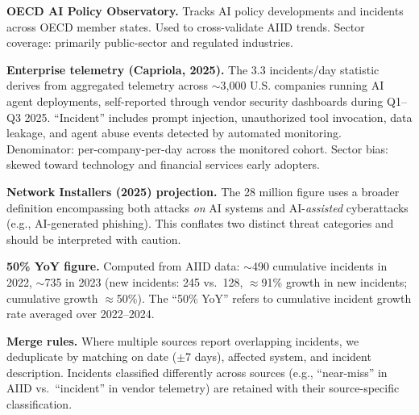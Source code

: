 \documentclass[conference]{IEEEtran}
\begin{document}
\textbf{OECD AI Policy Observatory.} Tracks AI policy developments and incidents across OECD member states. Used to cross-validate AIID trends. Sector coverage: primarily public-sector and regulated industries.

\textbf{Enterprise telemetry (Capriola, 2025).} The 3.3 incidents/day statistic derives from aggregated telemetry across $\sim$3,000 U.S. companies running AI agent deployments, self-reported through vendor security dashboards during Q1--Q3 2025. ``Incident'' includes prompt injection, unauthorized tool invocation, data leakage, and agent abuse events detected by automated monitoring. Denominator: per-company-per-day across the monitored cohort. Sector bias: skewed toward technology and financial services early adopters.

\textbf{Network Installers (2025) projection.} The 28 million figure uses a broader definition encompassing both attacks \emph{on} AI systems and AI-\emph{assisted} cyberattacks (e.g., AI-generated phishing). This conflates two distinct threat categories and should be interpreted with caution.

\textbf{50\% YoY figure.} Computed from AIID data: $\sim$490 cumulative incidents in 2022, $\sim$735 in 2023 (new incidents: 245 vs.\ 128, $\approx$91\% growth in new incidents; cumulative growth $\approx$50\%). The ``50\% YoY'' refers to cumulative incident growth rate averaged over 2022--2024.

\textbf{Merge rules.} Where multiple sources report overlapping incidents, we deduplicate by matching on date ($\pm$7 days), affected system, and incident description. Incidents classified differently across sources (e.g., ``near-miss'' in AIID vs.\ ``incident'' in vendor telemetry) are retained with their source-specific classification.
\end{document}
